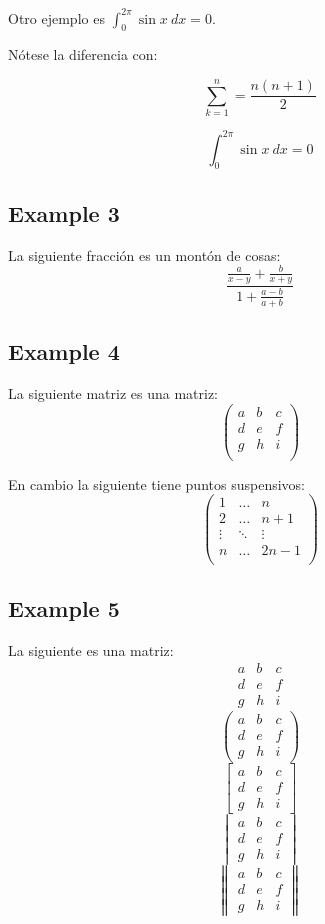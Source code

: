 \documentclass[a4paper,11pt]{article}
\begin{document}
Otro ejemplo es $\displaystyle{\int_0^{2\pi} \sin x\ dx = 0}$.

Nótese la diferencia con:

$$\sum_{k=1}^{n}=\frac{n(n+1)}{2}$$

$$\textstyle{\int_0^{2\pi} \sin x\ dx = 0}$$

\subsection{Example 3}
La siguiente fracción es un montón de cosas:
$$\frac{\frac{a}{x-y}+\frac{b}{x+y}}{1+\frac{a-b}{a+b}}$$

\subsection{Example 4}
La siguiente matriz es una matriz:
$$
\left(
    \begin{array}{lll}
        a & b & c \\
        d & e & f \\
        g & h & i \\
    \end{array}
\right)
$$

En cambio la siguiente tiene puntos suspensivos:
$$
\left(
    \begin{array}{ccc}
        1      & \hdots & n \\
        2      & \hdots & n+1 \\
        \vdots & \ddots & \vdots \\
        n      & \hdots & 2n-1 \\
    \end{array}
\right)
$$

\subsection{Example 5}
La siguiente es una matriz:
$$\begin{matrix}
a & b & c \\ d & e & f \\ g & h & i
\end{matrix}$$
$$\begin{pmatrix}
a & b & c \\ d & e & f \\ g & h & i
\end{pmatrix}$$
$$\begin{bmatrix}
a & b & c \\ d & e & f \\ g & h & i
\end{bmatrix}$$
$$\begin{vmatrix}
a & b & c \\ d & e & f \\ g & h & i
\end{vmatrix}$$
$$\begin{Vmatrix}
a & b & c \\ d & e & f \\ g & h & i
\end{Vmatrix}$$
\end{document}
